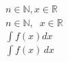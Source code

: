 \documentclass{article} %
\newcommand{\R}{\mathbb{R}}
\newcommand{\N}{\mathbb{N}}
\begin{document}
$n \in \N, x \in \R$\\
$n \in \N, \; \; x \in \R$\\
$\int f(x)dx$\\
$\displaystyle{\int} f(x)\, dx$
\end{document}
